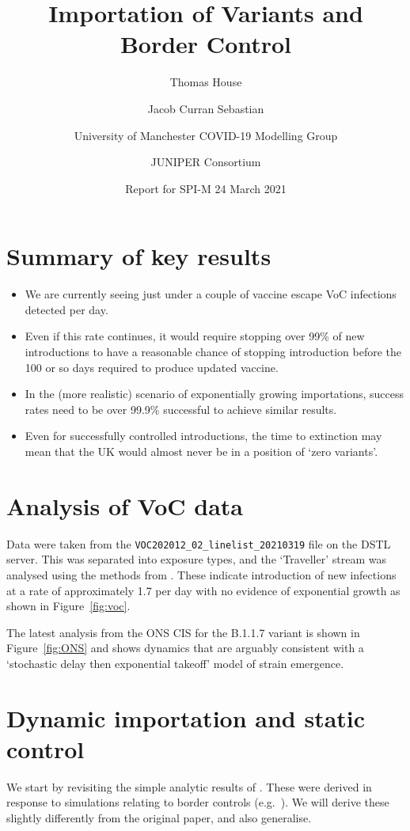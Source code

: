\documentclass[10pt,a4paper]{article}
\title{\sc Importation of Variants and Border Control}
\author{Thomas House \and Jacob Curran Sebastian \and University of Manchester
COVID-19 Modelling Group \and JUNIPER Consortium}
\date{Report for SPI-M 24 March 2021}
\begin{document}
\maketitle
\thispagestyle{fancy}
\section{Summary of key results}

\begin{itemize}
\item We are currently seeing just under a couple of vaccine escape VoC infections
detected per day.
\item Even if this rate continues, it would require stopping over 99\% of new
introductions to have a reasonable chance of stopping introduction before
the 100 or so days required to produce updated vaccine.
\item In the (more realistic) scenario of exponentially growing importations,
success rates need to be over 99.9\% successful to achieve similar results.
\item Even for successfully controlled introductions, the time to extinction
may mean that the UK would almost never be in a position of `zero variants'.
\end{itemize}

\section{Analysis of VoC data}

Data were taken from the \texttt{VOC202012\_02\_linelist\_20210319} file on the
DSTL server. This was separated into exposure types, and the `Traveller' stream
was analysed using the methods from \citet{House:2018}. These indicate
introduction of new infections at a rate of approximately 1.7 per day with no
evidence of exponential growth as shown in Figure~\ref{fig:voc}.

The latest analysis from the ONS CIS for the B.1.1.7 variant is shown in
Figure~\ref{fig:ONS} and shows dynamics that are arguably consistent with
a `stochastic delay then exponential takeoff' model of strain emergence.

\section{Dynamic importation and static control}

We start by revisiting the simple analytic results of \citet{ScaliaTomba:2008}.
These were derived in response to simulations relating to border controls
(e.g.\ \citet{Hollingsworth:2006}). We will derive these slightly differently
from the original paper, and also generalise.
\end{document}
